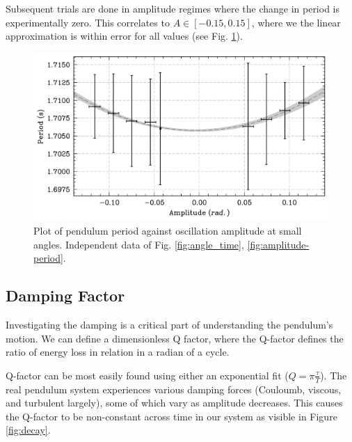 \documentclass[prl,twocolumn,amsmath,amssymb,superscriptaddress]{revtex4-2}
\begin{document}
Subsequent trials are done in amplitude regimes where the change in period is experimentally zero. This correlates to $A\in[-0.15,0.15]$, where we the linear approximation is within error for all values (see Fig. \ref{fig:small-angles}).

\begin{figure}[htb]
    \hspace{-20pt}
    \includegraphics[width=0.8\linewidth]{Q-factor-smallangleusage.png}
    \caption{Plot of pendulum period against oscillation amplitude at small angles. Independent data of Fig. \ref{fig:angle_time}, \ref{fig:amplitude-period}.}
    \label{fig:small-angles}
\end{figure}

\subsection{Damping Factor}

Investigating the damping is a critical part of understanding the pendulum's motion. We can define a dimensionless Q factor, where the Q-factor defines the ratio of energy loss in relation in a radian of a cycle.

Q-factor can be most easily found using either an exponential fit ($Q=\pi\frac{\tau}{T}$). The real pendulum system experiences various damping forces (Couloumb, viscous, and turbulent largely), some of which vary as amplitude decreases. This causes the Q-factor to be non-constant across time in our system as visible in Figure \ref{fig:decay}.
\end{document}
